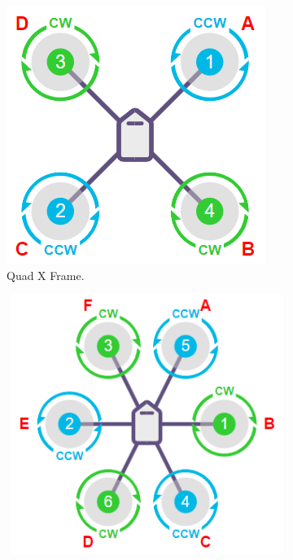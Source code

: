     \begin{figure}[h!]
        \centering
        \begin{subfigure}[b]{0.4\textwidth}
            \includegraphics[width=\textwidth]{pictures/quad_frame.png}
            \caption{Quad X Frame.}
            \label{fig:quad_frame}
        \end{subfigure}
        \hfill
        \begin{subfigure}[b]{0.4\textwidth}
            \includegraphics[width=\textwidth]{pictures/hexa_frame.png}

\end{subfigure}
\end{figure}
